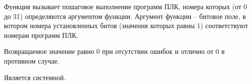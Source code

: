 Функция вызывает пошаговое выполнение программ ПЛК, номера которых (от 0 до 31) определяются аргументом функции. Аргумент функции – битовое поле, в котором номера установленных битов (значения которых равны 1) соответствуют номерам программ ПЛК.\killoverfullbefore

 Возвращаемое значение равно 0 при отсутствии ошибок и отлично от 0 в противном случае. \killoverfullbefore

Является системной.
